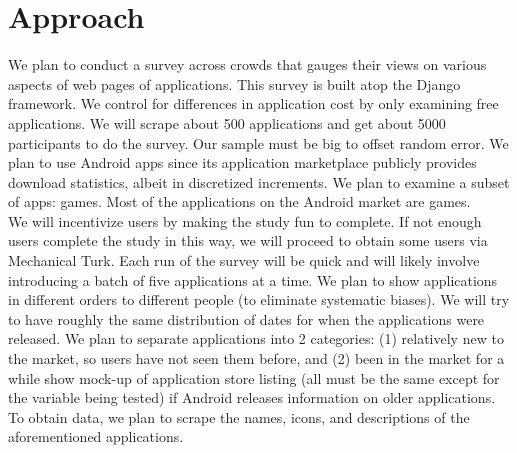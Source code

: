 \section{Approach}


We plan to conduct a survey across crowds that gauges their views on various aspects of web pages of applications. This survey is built atop the Django framework. We control for differences in application cost by only examining free applications.
We will scrape about 500 applications and get about 5000 participants to do the survey. Our sample must be big to offset random error.
We plan to use Android apps since its application marketplace publicly provides download statistics, albeit in discretized increments.
We plan to examine a subset of apps: games. Most of the applications on the Android market are games. \\

We will incentivize users by making the study fun to complete. If not enough users complete the study in this way, we will proceed to obtain some users via Mechanical Turk.
Each run of the survey will be quick and will likely involve introducing a batch of five applications at a time.
We plan to show applications in different orders to different people (to eliminate systematic biases).
We will try to have roughly the same distribution of dates for when the applications were released.
We plan to separate applications into 2 categories: (1) relatively new to the market, so users have not seen them before, and (2) been in the market for a while
show mock-up of application store listing (all must be the same except for the variable being tested) if Android releases information on older applications.
To obtain data, we plan to scrape the names, icons, and descriptions of the aforementioned applications.
